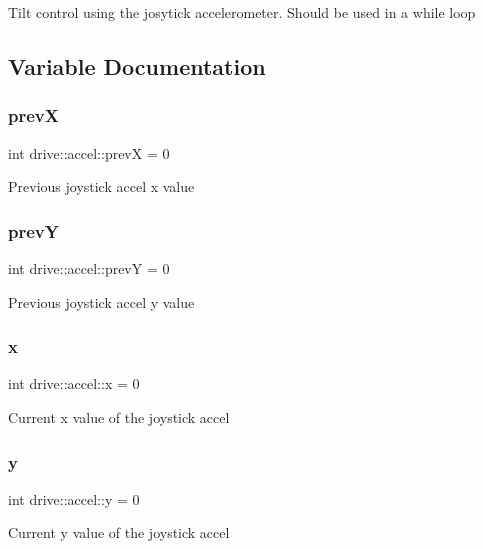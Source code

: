 Tilt control using the josytick accelerometer. Should be used in a while loop 

\subsection{Variable Documentation}
\mbox{\label{namespacedrive_1_1accel_aff072ce199309a54b7bc8e3f80f6e15c}} 
\subsubsection{\texorpdfstring{prevX}{prevX}}
{\footnotesize\ttfamily int drive\+::accel\+::prevX = 0}

Previous joystick accel x value \mbox{\label{namespacedrive_1_1accel_ae0f4ef2b1c049d481f496d680dd3f9bd}} 
\subsubsection{\texorpdfstring{prevY}{prevY}}
{\footnotesize\ttfamily int drive\+::accel\+::prevY = 0}

Previous joystick accel y value \mbox{\label{namespacedrive_1_1accel_ac04cdc79ef60e183664808e63c64204a}} 
\subsubsection{\texorpdfstring{x}{x}}
{\footnotesize\ttfamily int drive\+::accel\+::x = 0}

Current x value of the joystick accel \mbox{\label{namespacedrive_1_1accel_ab30da3026058091c6ee42e12c4e62432}} 
\subsubsection{\texorpdfstring{y}{y}}
{\footnotesize\ttfamily int drive\+::accel\+::y = 0}

Current y value of the joystick accel 